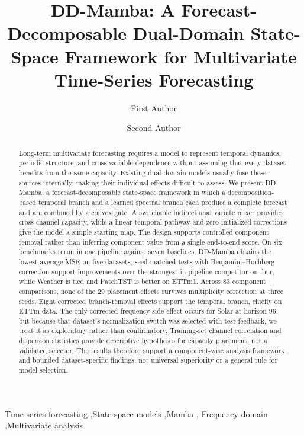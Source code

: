 \documentclass[review,12pt]{elsarticle}
\newcommand{\model}{DD-Mamba}
\begin{document}
\begin{frontmatter}

\title{\model{}: A Forecast-Decomposable Dual-Domain State-Space Framework
for Multivariate Time-Series Forecasting}

\author[aff1]{First Author}
\author[aff1]{Second Author}
\address[aff1]{Department, University, City, Country}

\begin{abstract}
Long-term multivariate forecasting requires a model to represent temporal
dynamics, periodic structure, and cross-variable dependence without assuming
that every dataset benefits from the same capacity. Existing dual-domain
models usually fuse these sources internally, making their individual effects
difficult to assess. We present \model{}, a forecast-decomposable state-space
framework in which a decomposition-based temporal branch and a learned
spectral branch each produce a complete forecast and are combined by a convex
gate. A switchable bidirectional variate mixer provides cross-channel
capacity, while a linear temporal pathway and zero-initialized corrections
give the model a simple starting map. The design supports controlled component
removal rather than inferring component value from a single end-to-end score.
On six benchmarks rerun in one pipeline against seven baselines, \model{}
obtains the lowest average MSE on five datasets; seed-matched tests with
Benjamini--Hochberg correction support improvements over the strongest
in-pipeline competitor on four, while Weather is tied and PatchTST is better
on ETTm1. Across 83 component comparisons, none of the 29 placement effects
survives multiplicity correction at three seeds. Eight corrected
branch-removal effects support the temporal branch, chiefly on ETTm data.
The only corrected frequency-side effect occurs for Solar at horizon 96, but
because that dataset's normalization switch was selected with test feedback,
we treat it as exploratory rather than confirmatory. Training-set channel
correlation and dispersion statistics provide descriptive hypotheses for
capacity placement, not a validated selector. The results therefore support
a component-wise analysis framework and bounded dataset-specific findings,
not universal superiority or a general rule for model selection.
\end{abstract}

\begin{keyword}
Time series forecasting \sep State-space models \sep Mamba \sep
Frequency domain \sep Multivariate analysis
\end{keyword}

\end{frontmatter}
\end{document}
